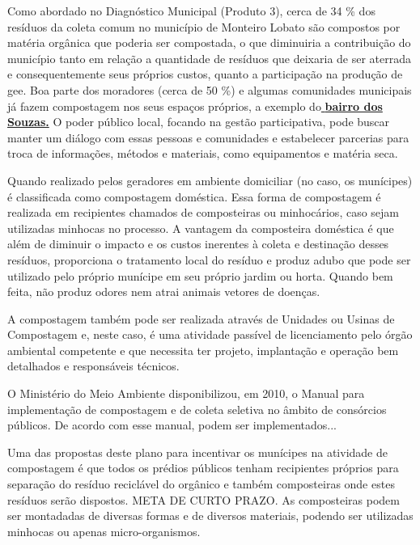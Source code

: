 Como abordado no Diagnóstico Municipal (Produto 3), cerca de 34 \% dos resíduos da coleta comum no município de Monteiro Lobato são compostos por matéria orgânica que poderia ser compostada, o que diminuiria a contribuição do município tanto em relação a quantidade de resíduos que deixaria de ser aterrada e consequentemente seus próprios custos, quanto a participação na produção de \gls{gee}. Boa parte dos moradores (cerca de 50 \%) e algumas comunidades municipais já fazem compostagem nos seus espaços próprios, a exemplo do\underline{\textbf{ bairro dos Souzas.}} O poder público local, focando na gestão participativa, pode buscar manter um diálogo com essas pessoas e comunidades e estabelecer parcerias para troca de informações, métodos e materiais, como equipamentos e matéria seca.

Quando realizado pelos geradores em ambiente domiciliar (no caso, os munícipes) é classificada como compostagem doméstica. Essa forma de compostagem é realizada em recipientes chamados de composteiras ou minhocários, caso sejam utilizadas minhocas no processo. A vantagem da composteira doméstica é que além de diminuir o impacto e os custos inerentes à coleta e destinação desses resíduos, proporciona o tratamento local do resíduo e produz adubo que pode ser utilizado pelo próprio munícipe em seu próprio jardim ou horta. Quando bem feita, não produz odores nem atrai animais vetores de doenças.

A compostagem também pode ser realizada através de Unidades ou Usinas de Compostagem e, neste caso, é uma atividade passível de licenciamento pelo órgão ambiental competente e que necessita ter projeto, implantação e operação bem detalhados e responsáveis técnicos. 

O Ministério do Meio Ambiente disponibilizou, em 2010, o Manual para implementação de compostagem e de coleta seletiva no âmbito de consórcios públicos. De acordo com esse manual, podem ser implementados...  


Uma das propostas deste plano para incentivar os munícipes na atividade de compostagem é que todos os prédios públicos tenham recipientes próprios para separação do resíduo reciclável do orgânico e também composteiras onde estes resíduos serão dispostos. META DE CURTO PRAZO. As composteiras podem ser montadadas de diversas formas e de diversos materiais, podendo ser utilizadas minhocas ou apenas micro-organismos.



